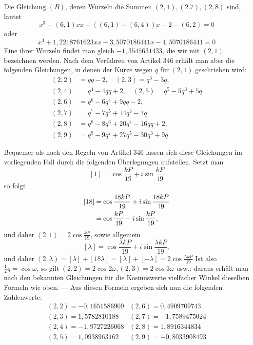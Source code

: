 Die Gleichung \((B)\), deren Wurzeln die Summen \((2,1),\allowbreak (2.7),\allowbreak (2,8)\) sind, lautet \[x^3-(6,1)xx+((6,1)+(6,4))x-2-(6,2)=0\] oder \[x^3+1{,}2218761623xx-3{,}5070186441x-4{,}5070186441=0\] Eine ihrer Wurzeln findet man gleich \(-1{,}3545631433\), die wir mit \((2,1)\) bezeichnen werden. Nach dem Verfahren von Artikel 346 erhält man aber die folgenden Gleichungen, in denen der Kürze wegen \(q\) für \((2,1)\) geschrieben wird: \[\begin{aligned}
(2,2)&=qq-2,\quad (2,3)=q^3-3q,\\
(2,4)&=q^4-4qq+2,\quad (2,5)=q^5-5q^3+5q\\
(2,6)&=q^6-6q^4+9qq-2,\\
(2,7)&=q^7-7q^5+14q^3-7q\\
(2,8)&=q^8-8q^6+20q^4-16qq+2,\\
(2,9)&=q^9-9q^7+27q^5-30q^3+9q
\end{aligned}\]

Bequemer als nach den Regeln von Artikel 346 lassen sich diese Gleichungen im vorliegenden Fall durch die folgenden Überlegungen aufstellen. Setzt man \[[1]=\cos\frac{kP}{19}+i\sin\frac{kP}{19}\] so folgt \[\begin{aligned}
\relax[18]&=\cos\frac{18kP}{19}+i\sin\frac{18kP}{19}\\
&=\cos\frac{kP}{19}-i\sin\frac{kP}{19},
\end{aligned}\] und daher \((2,1)=2\cos\frac{kP}{19}\), sowie allgemein \[[\lambda]=\cos\frac{\lambda kP}{19}+i\sin\frac{\lambda kP}{19},\] und daher \((2,\lambda)=[\lambda]+[18\lambda]=[\lambda]+[-\lambda]=2\cos\frac{\lambda kP}{19}\) Ist also \(\frac12q=\cos\omega\), so gilt \((2,2)=2\cos2\omega,\allowbreak (2,3)=2\cos3\omega\) usw.; daraus erhält man nach den bekannten Gleichungen für die Kosinuswerte vielfacher Winkel dieselben Formeln wie oben. — Aus diesen Formeln ergeben sich nun die folgenden Zahlenwerte: \[\begin{array}{r|r}(2,2)=-0{,}1651586909&(2,6)=0{,}4909709743\\(2,3)=1{,}5782810188&(2,7)=-1{,}7589475024\\(2,4)=-1{,}9727226068&(2,8)=1{,}8916344834\\(2,5)=1{,}0938963162&(2,9)=-0{,}8033908493\end{array}\]

